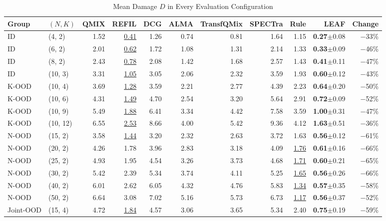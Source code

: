 \begin{table}[!t]
\centering
\scriptsize
\setlength{\tabcolsep}{3.2pt}
\caption{Mean Damage $D$ in Every Evaluation Configuration}
\label{tab:s-config}
\begin{tabular}{@{}llrrrrrrrrr@{}}
\toprule
Group & $(N,K)$ & QMIX & REFIL & DCG & ALMA & TransfQMix & SPECTra & Rule & LEAF & Change\\
\midrule
ID & (4, 2) & 1.52 & \underline{0.41} & 1.26 & 0.74 & 0.81 & 1.64 & 1.15 & \textbf{0.27}$\pm$0.08 & $-$33\%\\
ID & (6, 2) & 2.01 & \underline{0.62} & 1.72 & 1.08 & 1.31 & 2.14 & 1.33 & \textbf{0.33}$\pm$0.09 & $-$46\%\\
ID & (8, 2) & 2.43 & \underline{0.78} & 2.08 & 1.42 & 1.68 & 2.57 & 1.43 & \textbf{0.41}$\pm$0.11 & $-$47\%\\
ID & (10, 3) & 3.31 & \underline{1.05} & 3.05 & 2.06 & 2.32 & 3.59 & 1.93 & \textbf{0.60}$\pm$0.12 & $-$43\%\\
K-OOD & (10, 4) & 3.69 & \underline{1.28} & 3.59 & 2.21 & 2.77 & 4.39 & 2.23 & \textbf{0.64}$\pm$0.20 & $-$50\%\\
K-OOD & (10, 6) & 4.31 & \underline{1.49} & 4.70 & 2.54 & 3.20 & 5.64 & 2.91 & \textbf{0.72}$\pm$0.09 & $-$52\%\\
K-OOD & (10, 9) & 5.49 & \underline{1.88} & 6.41 & 3.34 & 4.42 & 7.58 & 3.59 & \textbf{1.00}$\pm$0.31 & $-$47\%\\
K-OOD & (10, 12) & 6.55 & \underline{2.53} & 8.66 & 4.00 & 5.42 & 9.36 & 4.12 & \textbf{1.63}$\pm$0.51 & $-$36\%\\
N-OOD & (15, 2) & 3.58 & \underline{1.44} & 3.20 & 2.32 & 2.63 & 3.72 & 1.63 & \textbf{0.56}$\pm$0.12 & $-$61\%\\
N-OOD & (20, 2) & 4.26 & 1.78 & 3.96 & 2.83 & 3.18 & 4.09 & \underline{1.76} & \textbf{0.61}$\pm$0.16 & $-$66\%\\
N-OOD & (25, 2) & 4.93 & 1.95 & 4.54 & 3.26 & 3.73 & 4.68 & \underline{1.71} & \textbf{0.60}$\pm$0.21 & $-$65\%\\
N-OOD & (30, 2) & 5.42 & 2.39 & 5.34 & 3.74 & 4.11 & 5.25 & \underline{1.65} & \textbf{0.56}$\pm$0.26 & $-$66\%\\
N-OOD & (40, 2) & 6.01 & 2.62 & 6.05 & 4.32 & 4.76 & 5.83 & \underline{1.34} & \textbf{0.57}$\pm$0.35 & $-$58\%\\
N-OOD & (50, 2) & 6.64 & 3.08 & 7.02 & 5.16 & 5.73 & 6.73 & \underline{1.17} & \textbf{0.56}$\pm$0.37 & $-$52\%\\
Joint-OOD & (15, 4) & 4.72 & \underline{1.84} & 4.57 & 3.06 & 3.65 & 5.34 & 2.40 & \textbf{0.75}$\pm$0.19 & $-$59\%\\

\end{tabular}
\end{table}
